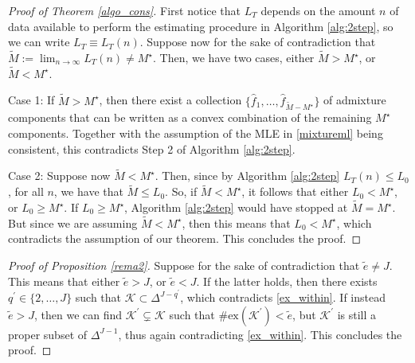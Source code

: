 \documentclass[12pt, reqno]{amsart}
\theoremstyle{definition}
\begin{document}
\begin{proof}[Proof of Theorem \ref{algo_cons}]
    First notice that $L_T$ depends on the amount $n$ of data available to perform the estimating procedure in Algorithm \ref{alg:2step}, so we can write $L_T\equiv L_T(n)$. Suppose now for the sake of contradiction that $\tilde{M}:=\lim_{n\rightarrow\infty} L_T(n) \neq M^\star$. Then, we have two cases, either $\tilde{M} > M^\star$, or $\tilde{M} < M^\star$.

    Case 1: If $\tilde{M} > M^\star$, then there exist a collection $\{\hat{f}_1,\ldots,\hat{f}_{\tilde{M}-M^\star}\}$ of admixture components that can be written as a convex combination of the remaining $M^\star$ components. Together with the assumption of the MLE in \eqref{mixtureml} being consistent, this contradicts Step 2 of Algorithm \ref{alg:2step}.

    Case 2: Suppose now $\tilde{M} < M^\star$. Then, since by Algorithm \ref{alg:2step} $L_T(n) \leq L_0$, for all $n$, we have that $\tilde{M}\leq L_0$. So, if $\tilde{M} < M^\star$, it follows that either $L_0 < M^\star$, or $L_0 \geq M^\star$. If $L_0 \geq M^\star$, Algorithm \ref{alg:2step} would have stopped at $\tilde{M} = M^\star$. But since we are assuming $\tilde{M} < M^\star$, then this means that $L_0 < M^\star$, which contradicts the assumption of our theorem. This concludes the proof.
\end{proof}

\begin{proof}[Proof of Proposition \ref{rema2}]

Suppose for the sake of contradiction that $\tilde{e}\neq J$. This means that either $\tilde{e}>J$, or $\tilde{e}<J$. If the latter holds, then there exists $q^\prime\in\{2,\ldots,J\}$ such that $\mathscr{K} \subset \Delta^{J-q^\prime}$, which contradicts \eqref{ex_within}. If instead $\tilde{e}>J$, then we can find $\mathscr{K}^\prime \subsetneq \mathscr{K}$ such that $\# \text{ex}(\mathscr{K}^\prime)<\tilde{e}$, but $\mathscr{K}^\prime$ is still a proper subset of $\Delta^{J-1}$, thus again contradicting \eqref{ex_within}. This concludes the proof.
\end{proof}




\end{document}
